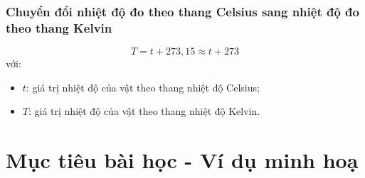 \subsubsection{Chuyển đổi nhiệt độ đo theo thang Celsius sang nhiệt độ đo theo thang Kelvin}
\begin{equation}
	T=t+273,15\approx t+273
\end{equation}
với:
\begin{itemize}
	\item $t$: giá trị nhiệt độ của vật theo thang nhiệt độ Celsius;
	\item $T$: giá trị nhiệt độ của vật theo thang nhiệt độ Kelvin.
\end{itemize}
\section{Mục tiêu bài học - Ví dụ minh hoạ}
